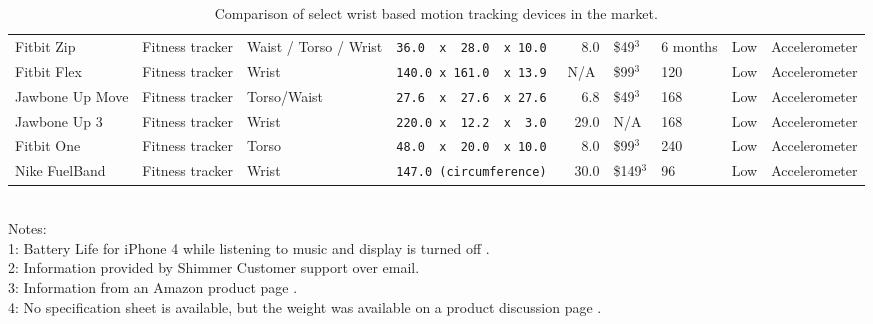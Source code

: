 \begin{landscape}
\begin{table}[h]
{\begin{tabular}{@{}lllllllll@{}}
Fitbit Zip       & Fitness tracker & Waist / Torso / Wrist & \texttt{36.0~ x ~28.0~ x 10.0}         & ~~~8.0    & \$49$^3$  & 6 months                        & Low             & Accelerometer                                                                                                   \\[1em]
Fitbit Flex      & Fitness tracker & Wrist                 & \texttt{140.0 x 161.0~ x 13.9}     	& ~N/A    	& \$99$^3$  & 120                         & Low             & Accelerometer                                                                                                   \\[1em]
Jawbone Up Move  & Fitness tracker & Torso/Waist           & \texttt{27.6~ x ~27.6~ x 27.6} 			& ~~~6.8    & \$49$^3$  & 168                         & Low             & Accelerometer                                                                                                   \\[1em]
Jawbone Up 3     & Fitness tracker & Wrist                 & \texttt{220.0  x ~12.2~ x ~3.0}      	& ~~29.0    & N/A   & 168                         & Low             & Accelerometer                                                                                                   \\[1em]
Fitbit One       & Fitness tracker & Torso                 & \texttt{48.0~ x ~20.0~ x  10.0}        & ~~~8.0    & \$99$^3$  & 240                         & Low             & Accelerometer                                                                                                   \\[1em]
Nike FuelBand    & Fitness tracker & Wrist                 & \texttt{147.0	 (circumference)}   	& ~~30.0   	& \$149$^3$ & 96                          & Low             & Accelerometer                                                                                                   \\ \bottomrule
\end{tabular}
}
\caption{Comparison of select wrist based motion tracking devices in the market.}
\label{Tab:IntroComp}
\end{table}


\hfill \\
Notes: \\
1: Battery Life for iPhone 4 while listening to music and display is turned off \cite{Web:iphone4specs}.\\
2: Information provided by Shimmer Customer support over email.\\
3: Information from an Amazon product page \cite{Web:AmazonGear2}.\\
4: No specification sheet is available, but the weight was available on a product discussion page \cite{Web:SMyoWeight}.
\end{landscape}
